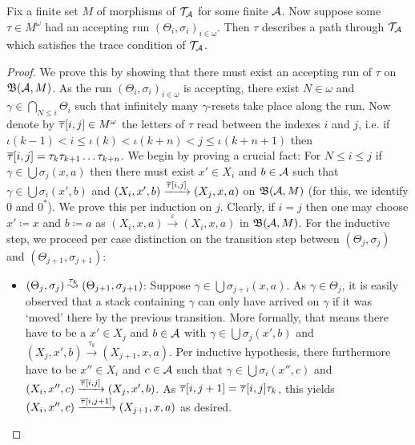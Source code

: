 \begin{lemma}\label{lem:run-to-tc}
  Fix a finite set $M$ of morphisms of $\mathcal{T}_{\mathcal{A}}$ for some finite $\mathcal{A}$. Now
  suppose some $\tau \in M^\omega$ had an accepting run $(\Theta_i, \sigma_i)_{i
  \in \omega}$. Then $\tau$ describes a path through $\mathcal{T}_{\mathcal{A}}$ which satisfies the
  trace condition of $\mathcal{T}_{\mathcal{A}}$.
\end{lemma}
\begin{proof}
  We prove this by showing that there must exist an accepting run of $\tau$ on
  $\mathfrak{B}(\mathcal{A}, M)$. As the run $(\Theta_i, \sigma_i)_{i \in \omega}$ is accepting,
  there exist $N \in \omega$ and $\gamma \in \bigcap_{N \leq i} \Theta_i$ such
  that infinitely many $\gamma$-resets take place along the run. Now denote by
  $\overline{\tau}[i, j] \in M^\omega$ the letters of $\tau$ read between the indexes
  $i$ and $j$, i.e. if $\iota(k - 1) < i \leq \iota(k) < \iota(k + n) < j \leq
  \iota(k + n + 1)$ then $\overline{\tau}[i, j] = \tau_k\tau_{k + 1} \ldots \tau_{k +
    n}$. We begin by proving a crucial fact: For $N \leq i \leq j$ if $\gamma \in \bigcup \sigma_j(x,
  a)$ then there must exist $x' \in X_i$ and $b \in \mathcal{A}$ such that $\gamma \in
  \bigcup \sigma_i(x', b)$ and $(X_i, x', b) \xrightarrow{\overline{\tau}[i, j]} (X_j,
  x, a)$ on
  $\mathfrak{B}(\mathcal{A}, M)$ (for this, we identify $0$ and $0^*$). We prove this per
  induction on $j$. Clearly, if $i = j$ then one
  may choose $x' \coloneq x$ and $b \coloneq a$ as $(X_i, x, a)
  \xrightarrow{\varepsilon} (X_i, x, a)$ in $\mathfrak{B}(\mathcal{A}, M)$. For the inductive step, we
  proceed per case distinction on the transition step between $(\Theta_j,
  \sigma_j)$ and $(\Theta_{j + 1}, \sigma_{j + 1})$:
  \begin{itemize}
  \item $(\Theta_j, \sigma_j) \stackrel{\tau_k}{\leadsto} (\Theta_{j + 1}, \sigma_{j + 1})$:
    Suppose $\gamma \in \bigcup \sigma_{j + i}(x, a)$. As $\gamma \in \Theta_j$,
    it is easily observed that a stack containing $\gamma$ can only have arrived
    on $\gamma$ if it was `moved' there by the previous transition. More
    formally, that means there have to be a $x' \in X_j$ and $b \in \mathcal{A}$ with
    $\gamma \in \bigcup \sigma_j(x', b)$ and $(X_j, x', b) \xrightarrow{\tau_k}
    (X_{j + 1}, x, a)$. Per inductive hypothesis, there furthermore have to be
    $x'' \in X_i$ and $c \in \mathcal{A}$ such that $\gamma \in \bigcup\sigma_i(x'', c)$
    and $(X_i, x'', c) \xrightarrow{\overline{\tau}[i, j]} (X_j, x', b)$. As
    $\overline{\tau}[i, j + 1] = \overline{\tau}[i, j]\tau_k$, this yields $(X_i, x'', c)
    \xrightarrow{\overline{\tau}[i, j + 1]} (X_{j + 1}, x, a)$ as desired.

\end{itemize}
\end{proof}
